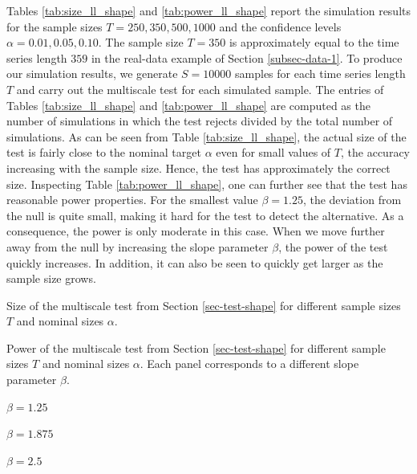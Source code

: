 Tables \ref{tab:size_ll_shape} and \ref{tab:power_ll_shape} report the simulation results for the sample sizes $T=250,350,500, 1000$ and the confidence levels $\alpha = 0.01, 0.05, 0.10$. The sample size $T = 350$ is approximately equal to the time series length $359$ in the real-data example of Section \ref{subsec-data-1}. To produce our simulation results, we generate $S=10000$ samples for each time series length $T$ and carry out the multiscale test for each simulated sample. The entries of Tables \ref{tab:size_ll_shape} and \ref{tab:power_ll_shape} are computed as the number of simulations in which the test rejects divided by the total number of simulations. As can be seen from Table \ref{tab:size_ll_shape}, the actual size of the test is fairly close to the nominal target $\alpha$ even for small values of $T$, the accuracy increasing with the sample size. Hence, the test has approximately the correct size. Inspecting Table \ref{tab:power_ll_shape}, one can further see that the test has reasonable power properties. For the smallest value $\beta = 1.25$, the deviation from the null is quite small, making it hard for the test to detect the alternative. As a consequence, the power is only moderate in this case. When we move further away from the null by increasing the slope parameter $\beta$, the power of the test quickly increases. In addition, it can also be seen to quickly get larger as the sample size grows. 
 

\begin{table}[t]
\footnotesize{
\begin{center}
\caption{Size of the multiscale test from Section \ref{sec-test-shape} for different sample sizes $T$ and nominal sizes $\alpha$.}
\label{tab:size_ll_shape}
\renewcommand{\arraystretch}{1.2}

\end{center}}
\end{table}

\begin{table}[t]
\footnotesize{
\begin{center}
\caption{Power of the multiscale test from Section \ref{sec-test-shape} for different sample sizes $T$ and nominal sizes $\alpha$. Each panel corresponds to a different slope parameter $\beta$.}\label{tab:power_ll_shape}
\begin{subtable}[b]{0.32\textwidth}
\centering
\caption{$\beta = 1.25$}\label{tab:power_050_ll_shape}
\renewcommand{\arraystretch}{1.2}

\end{subtable}
\begin{subtable}[b]{0.32\textwidth}
\centering
\caption{$\beta = 1.875$}\label{tab:power_075_ll_shape}
\renewcommand{\arraystretch}{1.2}

\end{subtable}
\begin{subtable}[b]{0.32\textwidth}
\centering
\caption{$\beta = 2.5$}\label{tab:power_100_ll_shape}
\renewcommand{\arraystretch}{1.2}

\end{subtable}
\end{center}}
\end{table}


